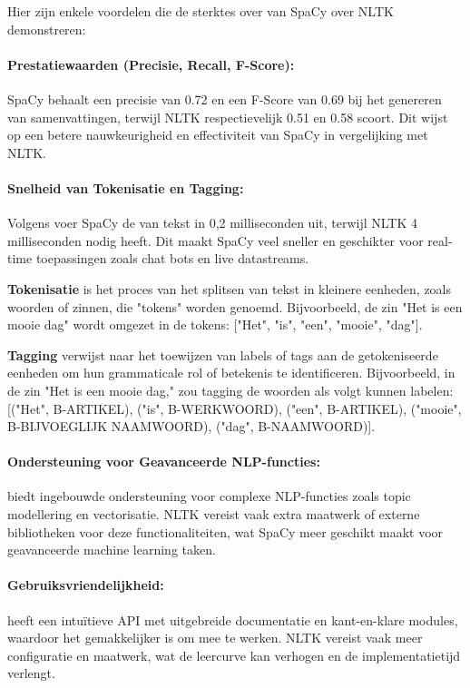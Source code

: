 Hier zijn enkele voordelen die de sterktes over van SpaCy over NLTK demonstreren:
\paragraph{Prestatiewaarden (Precisie, Recall, F-Score):} SpaCy behaalt een precisie van 0.72 en een F-Score van 0.69 bij het genereren van samenvattingen, terwijl NLTK respectievelijk 0.51 en 0.58 scoort. Dit wijst op een betere nauwkeurigheid en effectiviteit van SpaCy in vergelijking met NLTK.

\paragraph{Snelheid van Tokenisatie en Tagging:} Volgens \textcite{Saadani_2024} voer SpaCy de  van tekst in 0,2 milliseconden uit, terwijl NLTK 4 milliseconden nodig heeft. Dit maakt SpaCy veel sneller en geschikter voor real-time toepassingen zoals chat bots en live datastreams.

\textbf{Tokenisatie} is het proces van het splitsen van tekst in kleinere eenheden, zoals woorden of zinnen, die "tokens" worden genoemd. Bijvoorbeeld, de zin "Het is een mooie dag" wordt omgezet in de tokens: ["Het", "is", "een", "mooie", "dag"].

\textbf{Tagging} verwijst naar het toewijzen van labels of tags aan de getokeniseerde eenheden om hun grammaticale rol of betekenis te identificeren. Bijvoorbeeld, in de zin "Het is een mooie dag," zou tagging de woorden als volgt kunnen labelen: [("Het", B-ARTIKEL), ("is", B-WERKWOORD), ("een", B-ARTIKEL), ("mooie", B-BIJVOEGLIJK NAAMWOORD), ("dag", B-NAAMWOORD)].

\paragraph{Ondersteuning voor Geavanceerde NLP-functies:} \autocite{spacyff} biedt ingebouwde ondersteuning voor complexe NLP-functies zoals topic modellering en vectorisatie. NLTK vereist vaak extra maatwerk of externe bibliotheken voor deze functionaliteiten, wat SpaCy meer geschikt maakt voor geavanceerde machine learning taken.

\paragraph{Gebruiksvriendelijkheid:} \autocite{spacyff} heeft een intuïtieve API met uitgebreide documentatie en kant-en-klare modules, waardoor het gemakkelijker is om mee te werken. NLTK vereist vaak meer configuratie en maatwerk, wat de leercurve kan verhogen en de implementatietijd verlengt.

